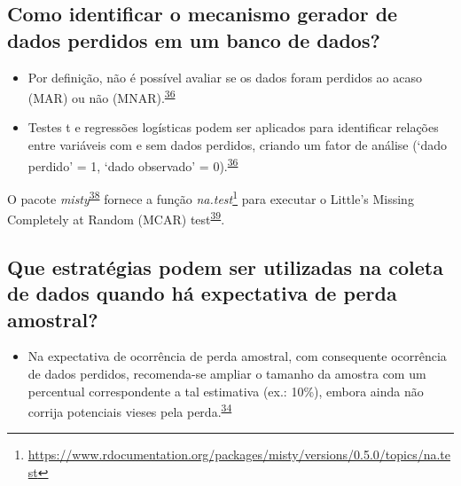 \documentclass[
  a4paper,
]{book}
\providecommand{\tightlist}{%
  \setlength{\itemsep}{0pt}\setlength{\parskip}{0pt}}
\renewcommand{\href}[2]{#2\footnote{\url{#1}}}
\newenvironment{infobox}[1]
  {
  \begin{itemize}
  \renewcommand{\labelitemi}{
    \raisebox{-.7\height}[0pt][0pt]{
      {\setkeys{Gin}{width=3em,keepaspectratio}
        \texttt{[image: \#1]}}
    }
  }
  \setlength{\fboxsep}{1em}
  \begin{blackbox}
  \item
  }
  {
  \end{blackbox}
  \end{itemize}
  }
\begin{document}
\hypertarget{como-identificar-o-mecanismo-gerador-de-dados-perdidos-em-um-banco-de-dados}{%
\subsection{Como identificar o mecanismo gerador de dados perdidos em um banco de dados?}\label{como-identificar-o-mecanismo-gerador-de-dados-perdidos-em-um-banco-de-dados}}

\begin{itemize}
\item
  Por definição, não é possível avaliar se os dados foram perdidos ao acaso (MAR) ou não (MNAR).\textsuperscript{\protect\hyperlink{ref-Heymans2022}{36}}
\item
  Testes t e regressões logísticas podem ser aplicados para identificar relações entre variáveis com e sem dados perdidos, criando um fator de análise (`dado perdido' = 1, `dado observado' = 0).\textsuperscript{\protect\hyperlink{ref-Heymans2022}{36}}
\end{itemize}

\begin{infobox}{images/Rlogo}
O pacote \emph{misty}\textsuperscript{\protect\hyperlink{ref-misty}{38}} fornece a função \href{https://www.rdocumentation.org/packages/misty/versions/0.5.0/topics/na.test}{\emph{na.test}} para executar o Little's Missing Completely at Random (MCAR) test\textsuperscript{\protect\hyperlink{ref-little1988}{39}}.

\end{infobox}

\hypertarget{que-estratuxe9gias-podem-ser-utilizadas-na-coleta-de-dados-quando-huxe1-expectativa-de-perda-amostral}{%
\subsection{Que estratégias podem ser utilizadas na coleta de dados quando há expectativa de perda amostral?}\label{que-estratuxe9gias-podem-ser-utilizadas-na-coleta-de-dados-quando-huxe1-expectativa-de-perda-amostral}}

\begin{itemize}
\tightlist
\item
  Na expectativa de ocorrência de perda amostral, com consequente ocorrência de dados perdidos, recomenda-se ampliar o tamanho da amostra com um percentual correspondente a tal estimativa (ex.: 10\%), embora ainda não corrija potenciais vieses pela perda.\textsuperscript{\protect\hyperlink{ref-Altman2007}{34}}
\end{itemize}
\end{document}
